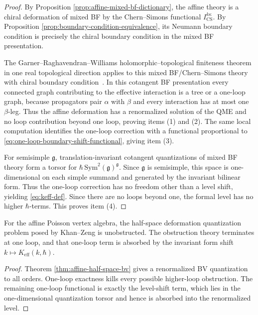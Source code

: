 \begin{proof}
By Proposition \ref{prop:affine-mixed-bf-dictionary}, the affine theory is a chiral deformation of mixed BF
by the Chern--Simons functional $I_{\mathrm{CS}}^{k\kappa}$. By Proposition \ref{prop:boundary-condition-equivalence},
its Neumann boundary condition is precisely the chiral boundary condition in the mixed BF presentation.

The Garner--Raghavendran--Williams holomorphic--topological finiteness theorem in one real topological
direction applies to this mixed BF/Chern--Simons theory with chiral boundary condition~\cite{GRW21}. In this
cotangent BF presentation every connected graph contributing to the effective interaction is a tree or a
one-loop graph, because propagators pair $\alpha$ with $\beta$ and every interaction has at most one
$\beta$-leg. Thus the affine deformation has a renormalized solution of the QME and no loop contribution beyond
one loop, proving items (1) and (2). The same local computation identifies the one-loop correction with a
functional proportional to \eqref{eq:one-loop-boundary-shift-functional}, giving item (3).

For semisimple $\mathfrak g$, translation-invariant cotangent quantizations of mixed BF theory form a torsor for
$\hbar\,\mathrm{Sym}^2(\mathfrak g)^{\mathfrak g}$. Since $\mathfrak g$ is semisimple, this space is one-dimensional on each
simple summand and generated by the invariant bilinear form. Thus the one-loop correction has no freedom other
than a level shift, yielding \eqref{eq:keff-def}. Since there are no loops beyond one, the formal level has no
higher $\hbar$-terms. This proves item (4).
\end{proof}

\begin{corollary}\label{cor:affine-kz-solved}
For the affine Poisson vertex algebra, the half-space deformation quantization problem posed by Khan--Zeng is
unobstructed. The obstruction theory terminates at one loop, and that one-loop term is absorbed by the invariant
form shift $k\mapsto K_{\mathrm{eff}}(k,\hbar)$.
\end{corollary}

\begin{proof}
Theorem \ref{thm:affine-half-space-bv} gives a renormalized BV quantization to all orders. One-loop exactness
kills every possible higher-loop obstruction. The remaining one-loop functional is exactly the level-shift term,
which lies in the one-dimensional quantization torsor and hence is absorbed into the renormalized level.
\end{proof}

